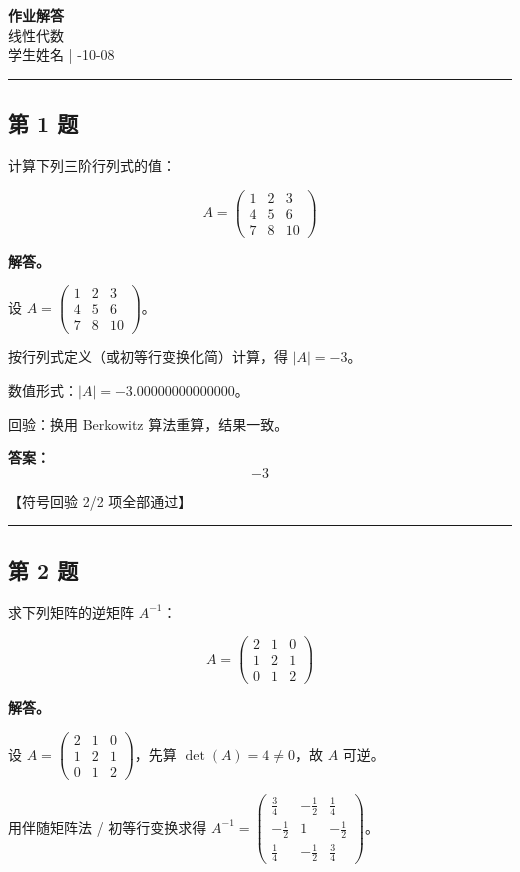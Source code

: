 \documentclass[12pt, a4paper]{article}
\newcommand{\problem}[1]{\subsection*{第 #1 题}}
\newcommand{\solution}{\textbf{解答。}}
\begin{document}
\begin{center}
    {\LARGE\bfseries 作业解答} \\[0.5em]
    {\large 线性代数} \\[0.3em]
    学生姓名 \quad | -10-08
\end{center}

\hrule
\vspace{1em}
\setlength{\parskip}{0.35em}
\problem{1}

计算下列三阶行列式的值：

$$
A = \begin{pmatrix} 1 & 2 & 3 \\ 4 & 5 & 6 \\ 7 & 8 & 10 \end{pmatrix}
$$

\solution

设 $A = \begin{pmatrix} 1 & 2 & 3 \\ 4 & 5 & 6 \\ 7 & 8 & 10 \end{pmatrix}$。

按行列式定义（或初等行变换化简）计算，得 $|A| = -3$。

数值形式：$|A| = -3.00000000000000$。

回验：换用 Berkowitz 算法重算，结果一致。

\textbf{答案：}
\[\boxed{-3}\]

\textcolor{okgreen}{【符号回验 2/2 项全部通过】}

\vspace{0.8em}
\hrule
\vspace{0.8em}

\problem{2}

求下列矩阵的逆矩阵 $A^{-1}$：

$$
A = \begin{pmatrix} 2 & 1 & 0 \\ 1 & 2 & 1 \\ 0 & 1 & 2 \end{pmatrix}
$$

\solution

设 $A = \begin{pmatrix} 2 & 1 & 0 \\ 1 & 2 & 1 \\ 0 & 1 & 2 \end{pmatrix}$，先算 $\det(A) = 4 \neq 0$，故 $A$ 可逆。

用伴随矩阵法 / 初等行变换求得 $A^{-1} = \begin{pmatrix} \frac{3}{4} & - \frac{1}{2} & \frac{1}{4} \\ - \frac{1}{2} & 1 & - \frac{1}{2} \\ \frac{1}{4} & - \frac{1}{2} & \frac{3}{4} \end{pmatrix}$。
\end{document}
